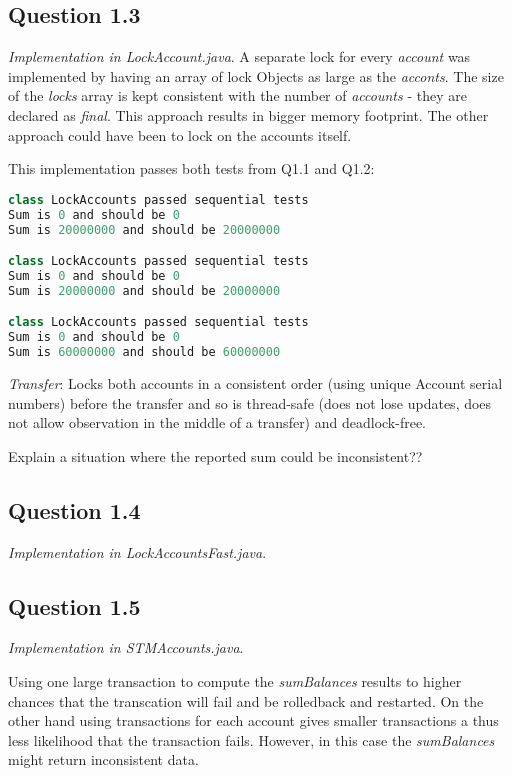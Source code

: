 \documentclass[format=acmsmall, review=false, screen=true]{acmart}
\begin{document}
\subsection{Question 1.3}

\textit{Implementation in LockAccount.java}. A separate lock for every \emph{account} was implemented by having an array of lock Objects as large as the \emph{acconts}. The size of the \emph{locks} array is kept consistent with the number of \emph{accounts} - they are declared as \emph{final}. This approach results in bigger memory footprint. The other approach could have been to lock on the accounts itself.

This implementation passes both tests from Q1.1 and Q1.2:

\begin{lstlisting}[language=java]
class LockAccounts passed sequential tests
Sum is 0 and should be 0
Sum is 20000000 and should be 20000000

class LockAccounts passed sequential tests
Sum is 0 and should be 0
Sum is 20000000 and should be 20000000

class LockAccounts passed sequential tests
Sum is 0 and should be 0
Sum is 60000000 and should be 60000000
\end{lstlisting}

\emph{Transfer}: Locks both accounts in a consistent order (using unique Account serial numbers) before the transfer and so is thread-safe (does not lose updates, does not allow observation in the middle of a transfer) and deadlock-free.

Explain a situation where the reported sum could be inconsistent??

\subsection{Question 1.4}

\textit{Implementation in LockAccountsFast.java}.

\subsection{Question 1.5}

\textit{Implementation in STMAccounts.java}.

Using one large transaction to compute the \emph{sumBalances} results to higher chances that the transcation will fail and be rolledback and restarted. On the other hand using transactions for each account gives smaller transactions a thus less likelihood that the transaction fails. However, in this case the \emph{sumBalances} might return inconsistent data. 
\end{document}
